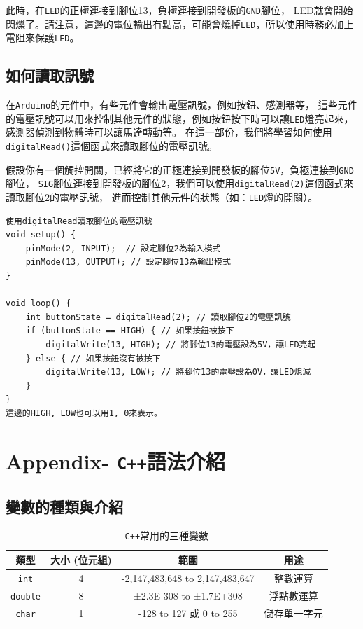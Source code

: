 \documentclass[12pt,a4paper]{article}
\begin{document}
此時，在\texttt{LED}的正極連接到腳位13，負極連接到開發板的\texttt{GND}腳位，
LED就會開始閃爍了。請注意，這邊的電位輸出有點高，可能會燒掉\texttt{LED}，所以使用時務必加上電阻來保護\texttt{LED}。

\newpage
\subsection{如何讀取訊號}
在\texttt{Arduino}的元件中，有些元件會輸出電壓訊號，例如按鈕、感測器等，
這些元件的電壓訊號可以用來控制其他元件的狀態，例如按鈕按下時可以讓\texttt{LED}燈亮起來，感測器偵測到物體時可以讓馬達轉動等。
在這一部份，我們將學習如何使用\texttt{digitalRead()}這個函式來讀取腳位的電壓訊號。

假設你有一個觸控開關，已經將它的正極連接到開發板的腳位\texttt{5V}，負極連接到\texttt{GND}腳位，
\texttt{SIG}腳位連接到開發板的腳位2，我們可以使用\texttt{digitalRead(2)}這個函式來讀取腳位2的電壓訊號，
進而控制其他元件的狀態（如：\texttt{LED}燈的開關）。

\begin{lstlisting}
使用digitalRead讀取腳位的電壓訊號
void setup() {
    pinMode(2, INPUT);  // 設定腳位2為輸入模式
    pinMode(13, OUTPUT); // 設定腳位13為輸出模式
}

void loop() {
    int buttonState = digitalRead(2); // 讀取腳位2的電壓訊號
    if (buttonState == HIGH) { // 如果按鈕被按下
        digitalWrite(13, HIGH); // 將腳位13的電壓設為5V，讓LED亮起
    } else { // 如果按鈕沒有被按下
        digitalWrite(13, LOW); // 將腳位13的電壓設為0V，讓LED熄滅
    }
}
這邊的HIGH, LOW也可以用1, 0來表示。
\end{lstlisting}

\newpage

\section{Appendix- \texttt{C++}語法介紹}


\subsection{變數的種類與介紹}

\begin{table}[h!]
\centering
\begin{tabular}{|c||c|c|c|}
\hline
\textbf{類型} & \textbf{大小 (位元組)} & \textbf{範圍} & \textbf{用途} \\ \hline
\texttt{int} & 4 & -2,147,483,648 to 2,147,483,647 & 整數運算 \\ \hline
\texttt{double} & 8 & ±2.3E-308 to ±1.7E+308 & 浮點數運算 \\ \hline
\texttt{char} & 1 & -128 to 127 或 0 to 255 & 儲存單一字元 \\ \hline
\end{tabular}
\caption{\texttt{C++}常用的三種變數}
\label{tab:datatype_comparison}
\end{table}
\end{document}
